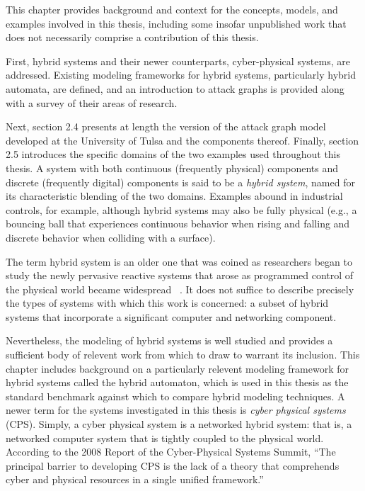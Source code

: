 This chapter provides background and context for the concepts, models, 
and examples involved in this thesis, including some insofar unpublished work
that does not necessarily comprise a contribution of this thesis. 

First, hybrid systems
and their newer counterparts, cyber-physical systems, are addressed. Existing
modeling frameworks for hybrid systems, particularly hybrid automata, are
defined, and an introduction to attack graphs is provided along with a
survey of their areas of research.

Next, section 2.4 presents at length the version of the attack graph model 
developed at the University of Tulsa and the components thereof. 
Finally, section 2.5 introduces the specific
domains of the two examples used throughout this thesis.
A system with both continuous (frequently physical) components and discrete (frequently digital)
components is said to be a \emph{hybrid system}, named for its characteristic blending of the
two domains. Examples abound in industrial controls, for example,
although hybrid systems may also be fully physical (e.g., a bouncing ball that experiences continuous
behavior when rising and falling and discrete behavior when colliding with a surface).

The term hybrid system is an older one that was coined as researchers began to study the newly
pervasive reactive systems that arose as programmed control of the physical world became 
widespread ~\cite{alur1993hybrid}. It does not suffice to describe precisely
the types of systems with which this work is concerned: a subset of hybrid
systems that incorporate a significant computer and networking component.

Nevertheless, the modeling of hybrid systems is well studied and provides a sufficient body
of relevent work from which to draw to warrant its inclusion. This chapter includes
background on a particularly relevent modeling framework for hybrid systems called the
hybrid automaton, which is used in this thesis as the standard benchmark against which to
compare hybrid modeling techniques.
A newer term for the systems investigated in this thesis is \emph{cyber physical systems}
 (CPS).
Simply, a cyber physical system is a networked hybrid system: that is, a 
networked computer system that is tightly coupled to the physical world.
According to the 2008 Report of the Cyber-Physical Systems Summit, ``The principal barrier to 
developing CPS is the lack of a theory that comprehends cyber and physical resources in a 
single unified framework.''~\cite{summitreport2008}

